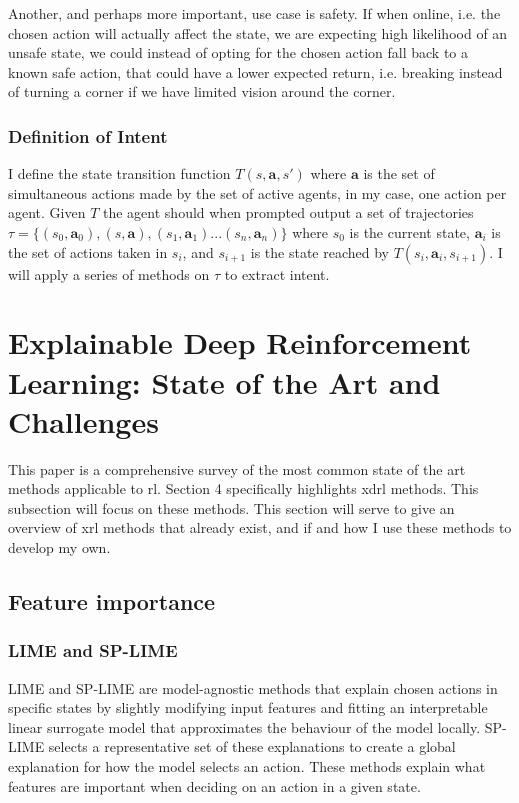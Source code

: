 \documentclass[UKenglish]{uiomasterthesis}
\begin{document}
Another, and perhaps more important, use case is safety. If when online, i.e. the chosen action will actually affect the state, we are expecting high likelihood of an unsafe state, we could instead of opting for the chosen action fall back to a known safe action, that could have a lower expected return, i.e. breaking instead of turning a corner if we have limited vision around the corner.


\subsubsection{Definition of Intent}
I define the state transition function $T(s, \textbf{a}, s')$ where $\textbf{a}$ is the set of simultaneous actions made by the set of active agents, in my case, one action per agent. Given $T$ the agent should when prompted output a set of trajectories $\tau = \{(s_0,\textbf{a}_0),(s,\textbf{a}),(s_1,\textbf{a}_1)...(s_n,\textbf{a}_n)\}$ where $s_0$ is the current state, $\textbf{a}_i$ is the set of actions taken in $s_i$, and $s_{i+1}$ is the state reached by $T(s_i,\textbf{a}_i, s_{i+1})$. I will apply a series of methods on $\tau$ to extract intent.

\section{Explainable Deep Reinforcement Learning: State of the Art and Challenges}
This paper is a comprehensive survey of the most common state of the art methods applicable to \ac{rl}. Section 4 specifically highlights \ac{xdrl} methods. This subsection will focus on these methods\cite{sota}. This section will serve to give an overview of \ac{xrl} methods that already exist, and if and how I use these methods to develop my own.

\subsection{Feature importance}


\subsubsection{LIME and SP-LIME}
LIME and SP-LIME are model-agnostic methods that explain chosen actions in specific states by slightly modifying input features and fitting an interpretable linear surrogate model that approximates the behaviour of the model locally. SP-LIME selects a representative set of these explanations to create a global explanation for how the model selects an action. These methods explain what features are important when deciding on an action in a given state.
\end{document}
